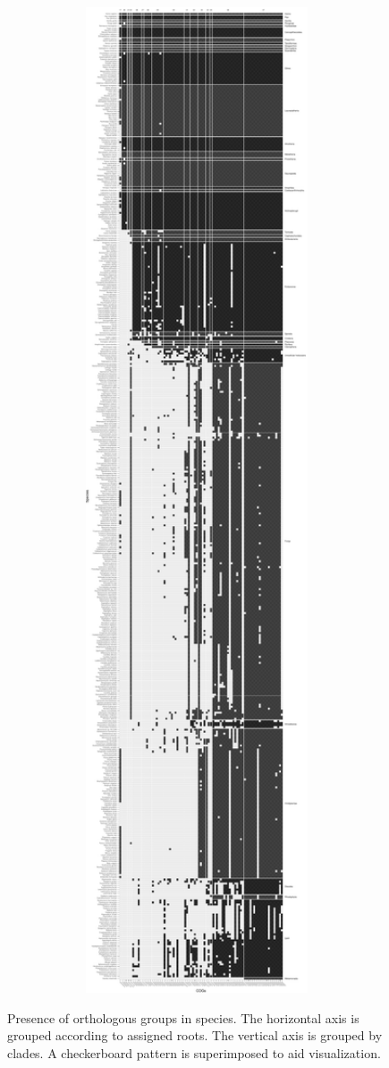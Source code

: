 \clearpage

\thispagestyle{empty}

\pdfpageheight=33in

\begin{figure}[p]

\caption{Presence of orthologous groups in species. The horizontal axis is grouped according to assigned roots. The vertical axis is grouped by clades. A checkerboard pattern is superimposed to aid visualization.}\label{fig:phyletic_patterns}

{\centering \includegraphics[height=31in, width=7in]{figs/analysis.geneplast.phyletic_patterns-1} }

\end{figure}

